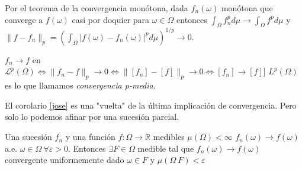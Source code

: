 Por el teorema de la convergencia monótona, dada $f_{n}(\omega)$ monótona que
converge a $f(\omega)$ casi por doquier para $\omega \in \Omega$ entonces
$\int_{\Omega}f_{n}^{p}d\mu \rightarrow \int_{\Omega}f^{p}d\mu$ y $\|f - f_{n}\|_{p}
= \left(\int_{\Omega}|f(\omega)-f_{n}(\omega)|^{p}d\mu\right)^{1/p} \rightarrow
0$.

$f_{n} \rightarrow f$ en $\mathcal L^{p}(\Omega) \Leftrightarrow \|f_{n}-f\|_{p}
\rightarrow 0 \Leftrightarrow \|[f_{n}]-[f]\|_{p} \rightarrow 0 \Leftrightarrow
{[f_{n}]} \rightarrow [f]]$ $L^{p}(\Omega)$ es lo que llamamos
\textit{convergencia p-media}.

El corolario \ref{jose} es una "vuelta" de la última implicación de
convergencia. Pero solo lo podemos afinar por una sucesión parcial.

\begin{nth}[Egorov]
  Una sucesión  $f_{n}$ y una función $f:\Omega \rightarrow \mathbb R $ medibles
  $\mu(\Omega) < \infty $ ${f_{n}(\omega)} \rightarrow f(\omega)$ a.e. $ \omega \in \Omega \
  \forall \varepsilon > 0$. Entonces $ \exists F \in \Omega $ medible tal que
  ${f_{n}(\omega)} \rightarrow f(\omega)$ convergente uniformemente dado $\omega
  \in F$ y $\mu(\Omega \ F) < \varepsilon$
\end{nth}

